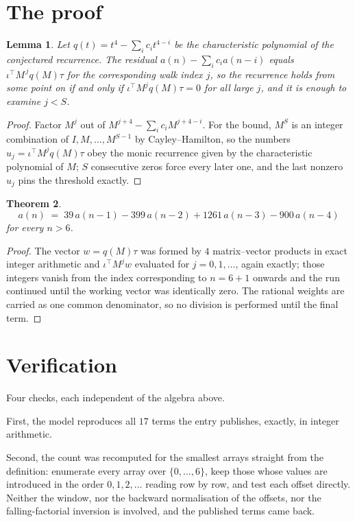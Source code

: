 \documentclass[11pt,a4paper]{article}
\theoremstyle{plain}
\newtheorem{theorem}{Theorem}
\newtheorem{lemma}[theorem]{Lemma}
\theoremstyle{definition}
\begin{document}
\section{The proof}

\begin{lemma}\label{lem:crit}
Let $q(t)=t^{4}-\sum_i c_it^{4-i}$ be the characteristic polynomial of the
conjectured recurrence. The residual $a(n)-\sum_ic_ia(n-i)$ equals
$\iota^{\!\top}M^{\,j}q(M)\tau$ for the corresponding walk index $j$, so the recurrence
holds from some point on if and only if $\iota^{\!\top}M^{j}q(M)\tau=0$ for all large $j$,
and it is enough to examine $j<S$.
\end{lemma}

\begin{proof}
Factor $M^{j}$ out of $M^{j+4}-\sum_ic_iM^{j+4-i}$. For the bound, $M^{S}$
is an integer combination of $I,M,\dots,M^{S-1}$ by Cayley--Hamilton, so the numbers
$u_j=\iota^{\!\top}M^{j}q(M)\tau$ obey the monic recurrence given by the characteristic
polynomial of $M$; $S$ consecutive zeros force every later one, and the last nonzero $u_j$
pins the threshold exactly.
\end{proof}

\begin{theorem}
\[
a(n)\;=\;39\,a(n-1) - 399\,a(n-2) + 1261\,a(n-3) - 900\,a(n-4)
\]
for every $n>6$.
\end{theorem}

\begin{proof}
The vector $w=q(M)\tau$ was formed by $4$ matrix--vector products in exact integer
arithmetic and $\iota^{\!\top}M^{j}w$ evaluated for $j=0,1,\dots$, again exactly; those
integers vanish from the index corresponding to $n=6+1$ onwards and the run continued
until the working vector was identically zero. The rational weights are carried as one common
denominator, so no division is performed until the final term.
\end{proof}

\section{Verification}

Four checks, each independent of the algebra above.

First, the model reproduces all $17$ terms the entry publishes, exactly, in integer
arithmetic.

Second, the count was recomputed for the smallest arrays straight from the definition:
enumerate every array over $\{0,\dots,6\}$, keep those whose values are introduced in the
order $0,1,2,\dots$ reading row by row, and test each offset directly. Neither the window, nor
the backward normalisation of the offsets, nor the falling-factorial inversion is involved, and
the published terms came back.
\end{document}
